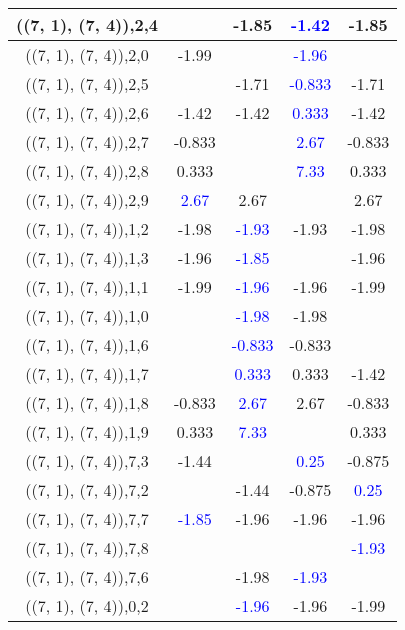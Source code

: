 \documentclass{article}
\begin{document}
\begin{center}
\begin{longtable}{|c|c|c|c|c|}
        	\hline
        	((7, 1), (7, 4)),2,4&&-1.85& \textcolor{blue}{-1.42}&-1.85\\
        	\hline
        	((7, 1), (7, 4)),2,0&-1.99&& \textcolor{blue}{-1.96}&\\
        	\hline
        	((7, 1), (7, 4)),2,5&&-1.71& \textcolor{blue}{-0.833}&-1.71\\
        	\hline
        	((7, 1), (7, 4)),2,6&-1.42&-1.42& \textcolor{blue}{0.333}&-1.42\\
        	\hline
        	((7, 1), (7, 4)),2,7&-0.833&& \textcolor{blue}{2.67}&-0.833\\
        	\hline
        	((7, 1), (7, 4)),2,8&0.333&& \textcolor{blue}{7.33}&0.333\\
        	\hline
        	((7, 1), (7, 4)),2,9& \textcolor{blue}{2.67}&2.67&&2.67\\
        	\hline
        	((7, 1), (7, 4)),1,2&-1.98& \textcolor{blue}{-1.93}&-1.93&-1.98\\
        	\hline
        	((7, 1), (7, 4)),1,3&-1.96& \textcolor{blue}{-1.85}&&-1.96\\
        	\hline
        	((7, 1), (7, 4)),1,1&-1.99& \textcolor{blue}{-1.96}&-1.96&-1.99\\
        	\hline
        	((7, 1), (7, 4)),1,0&& \textcolor{blue}{-1.98}&-1.98&\\
        	\hline
        	((7, 1), (7, 4)),1,6&& \textcolor{blue}{-0.833}&-0.833&\\
        	\hline
        	((7, 1), (7, 4)),1,7&& \textcolor{blue}{0.333}&0.333&-1.42\\
        	\hline
        	((7, 1), (7, 4)),1,8&-0.833& \textcolor{blue}{2.67}&2.67&-0.833\\
        	\hline
        	((7, 1), (7, 4)),1,9&0.333& \textcolor{blue}{7.33}&&0.333\\
        	\hline
        	((7, 1), (7, 4)),7,3&-1.44&& \textcolor{blue}{0.25}&-0.875\\
        	\hline
        	((7, 1), (7, 4)),7,2&&-1.44&-0.875& \textcolor{blue}{0.25}\\
        	\hline
        	((7, 1), (7, 4)),7,7& \textcolor{blue}{-1.85}&-1.96&-1.96&-1.96\\
        	\hline
        	((7, 1), (7, 4)),7,8&&&& \textcolor{blue}{-1.93}\\
        	\hline
        	((7, 1), (7, 4)),7,6&&-1.98& \textcolor{blue}{-1.93}&\\
        	\hline
        	((7, 1), (7, 4)),0,2&& \textcolor{blue}{-1.96}&-1.96&-1.99\\

\end{longtable}
\end{center}
\end{document}
